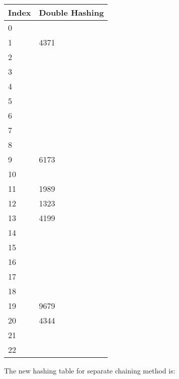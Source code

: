 \documentclass[12pt]{article}
\begin{document}
\begin{enumerate}
{	\begin{tabular}{| p{10mm}  | p{20mm} |}
	\hline
		Index & Double Hashing\\ \hline
		0 & \\ \hline
		1 & 4371 \\ \hline		
		2 & \\ \hline
		3 & \\ \hline
		4 & \\ \hline
		5 & \\ \hline 
		6 & \\ \hline
		7 & \\ \hline
		8 & \\ \hline
		9 & 6173\\ \hline
		10 & \\ \hline
		11 & 1989 \\ \hline
		12 & 1323 \\ \hline
		13 & 4199 \\ \hline
		14 & \\ \hline
		15 & \\ \hline
		16 & \\ \hline
		17 & \\ \hline
		18 & \\ \hline
		19 & 9679\\ \hline
		20 & 4344 \\ \hline
		21 & \\ \hline
		22 & \\ \hline
	\end{tabular}
}

The new hashing table for separate chaining method is:

\small{

}
\end{enumerate}
\end{document}
